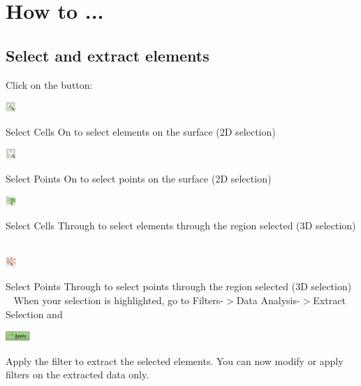 \begin{DoxyEnumerate}
\end{DoxyEnumerate}\hypertarget{index_howto}{}\section{How to ...}\label{index_howto}
\hypertarget{index_outlines}{}\subsection{Select and extract elements}\label{index_outlines}
Click on the button\+: ~\newline
 
\begin{DoxyImageNoCaption}
  \mbox{\includegraphics[width=0.03\textwidth]{selec_button}}
\end{DoxyImageNoCaption}
 {\ttfamily Select} {\ttfamily Cells} {\ttfamily On} to select elements on the surface (2D selection) ~\newline
 
\begin{DoxyImageNoCaption}
  \mbox{\includegraphics[width=0.03\textwidth]{selec2_button}}
\end{DoxyImageNoCaption}
 {\ttfamily Select} {\ttfamily Points} {\ttfamily On} to select points on the surface (2D selection) ~\newline
 
\begin{DoxyImageNoCaption}
  \mbox{\includegraphics[width=0.03\textwidth]{selec3_button}}
\end{DoxyImageNoCaption}
 {\ttfamily Select} {\ttfamily Cells} {\ttfamily Through} to select elements through the region selected (3D selection) ~\newline
 
\begin{DoxyImageNoCaption}
  \mbox{\includegraphics[width=0.03\textwidth]{selec4_button}}
\end{DoxyImageNoCaption}
 {\ttfamily Select} {\ttfamily Points} {\ttfamily Through} to select points through the region selected (3D selection) ~\newline
When your selection is highlighted, go to {\ttfamily Filters-\/$>$Data} {\ttfamily Analysis-\/$>$Extract} {\ttfamily Selection} and  
\begin{DoxyImageNoCaption}
  \mbox{\includegraphics[width=0.07\textwidth]{apply_button}}
\end{DoxyImageNoCaption}
 {\ttfamily Apply} the filter to extract the selected elements. You can now modify or apply filters on the extracted data only.

